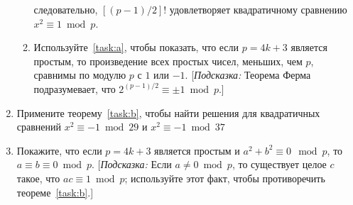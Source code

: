 \documentclass[11pt]{article}
\begin{document}
\begin{enumerate}
\begin{enumerate}
		следовательно, $[(p-1)/2]!$ удовлетворяет квадратичному сравнению $x^2\equiv1\bmod p$.
		\item Используйте~\ref{task:a}, чтобы показать, что если $p=4k+3$ является простым, то произведение всех простых чисел, меньших, чем $p$, сравнимы по модулю $p$ с $1$ или $-1$. [\textit{Подсказка:} Теорема Ферма подразумевает, что $2^{(p-1)/2}\equiv\pm1\bmod p$.]
		\end{enumerate}
	\item Примените теорему~\ref{task:b}, чтобы найти решения для квадратичных сравнений $x^2\equiv-1\bmod 29$ и $x^2\equiv-1\bmod37$
	\item Покажите, что если $p=4k+3$ является простым и $a^2+b^2\equiv0\mod p$, то $a\equiv b\equiv0\bmod p$. [\textit{Подсказка:} Если $a\ne0\bmod p$, то существует целое $c$ такое, что $ac\equiv1\bmod p$; используйте этот факт, чтобы противоречить теореме~\ref{task:b}.]
\end{enumerate}
\end{document}
